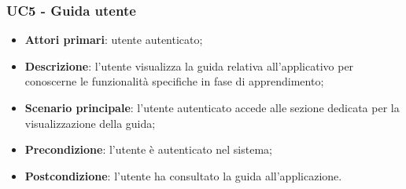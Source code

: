 \subsubsection{UC5 - Guida utente}
\begin{itemize}
	\item \textbf{Attori primari}: utente autenticato;
	\item \textbf{Descrizione}: l'utente visualizza la guida relativa all'applicativo per conoscerne le funzionalità specifiche in fase di apprendimento;
	\item \textbf{Scenario principale}: l'utente autenticato accede alle sezione dedicata per la visualizzazione della guida;
	\item \textbf{Precondizione}: l'utente è autenticato nel sistema;
	\item \textbf{Postcondizione}: l'utente ha consultato la guida all'applicazione.
\end{itemize}   